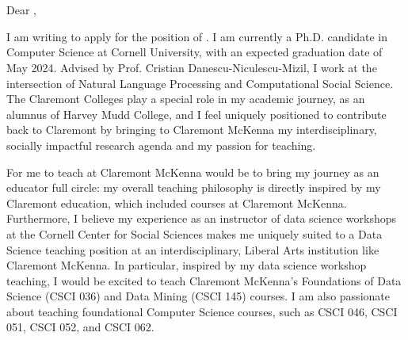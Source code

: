 \documentclass[12pt]{letter}
\begin{document}
\signature{Jonathan P. Chang}
\begin{letter}{
\department \\
\schoolnamelong \\
\schooladdress
}

\opening{
    Dear ,
}

I am writing to apply for the position of \position.
I am currently a Ph.D. candidate in Computer Science at Cornell University, with an expected graduation date of May 2024.
Advised by Prof. Cristian Danescu-Niculescu-Mizil, I work at the intersection of Natural Language Processing and Computational Social Science.
The Claremont Colleges play a special role in my academic journey, as an alumnus of Harvey Mudd College, and I feel uniquely positioned to contribute back to Claremont by bringing to Claremont McKenna my interdisciplinary, socially impactful research agenda and my passion for teaching.

For me to teach at Claremont McKenna would be to bring my journey as an educator full circle: my overall teaching philosophy is directly inspired by my Claremont education, which included courses at Claremont McKenna.
Furthermore, I believe my experience as an instructor of data science workshops at the Cornell Center for Social Sciences makes me uniquely suited to a Data Science teaching position at an interdisciplinary, Liberal Arts institution like Claremont McKenna.
In particular, inspired by my data science workshop teaching, I would be excited to teach Claremont McKenna's Foundations of Data Science (CSCI 036) and Data Mining (CSCI 145) courses.
I am also passionate about teaching foundational Computer Science courses, such as CSCI 046, CSCI 051, CSCI 052, and CSCI 062.


\end{letter}
\end{document}
